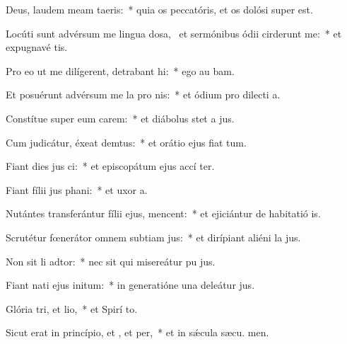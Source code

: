 \item Deus, laudem meam  taeris:~* quia os peccatóris, et os dolósi super   est.
\item Locúti sunt advérsum me lingua dosa,~\pscross{} et sermónibus ódii cirderunt me:~* et expugnavé  tis.
\item Pro eo ut me dilígerent, detrabant hi:~* ego au bam.
\item Et posuérunt advérsum me la pro nis:~* et ódium pro dilecti a.
\item Constítue super eum carem:~* et diábolus stet a  jus.
\item Cum judicátur, éxeat demtus:~* et orátio ejus fiat  tum.
\item Fiant dies jus ci:~* et episcopátum ejus accí ter.
\item Fiant fílii jus phani:~* et uxor  a.
\item Nutántes transferántur fílii ejus,  mencent:~* et ejiciántur de habitatió is.
\item Scrutétur fœnerátor omnem subtiam jus:~* et dirípiant aliéni la jus.
\item Non sit li adtor:~* nec sit qui misereátur pu jus.
\item Fiant nati ejus  initum:~* in generatióne una deleátur  jus.
\item Glória tri, et lio,~* et Spirí to.
\item Sicut erat in princípio, et , et per,~* et in sǽcula sæcu. men.
